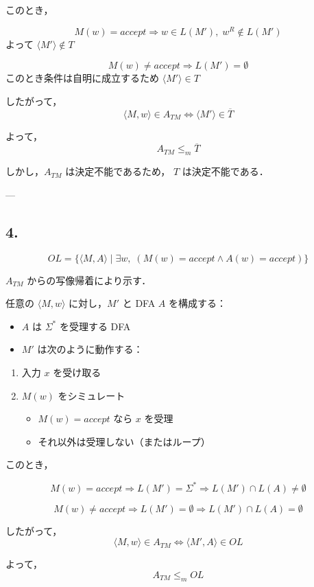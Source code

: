 \documentclass[a4paper,11pt]{ltjsarticle}
\begin{document}
このとき，

\[
M(w)=accept \Rightarrow w \in L(M'),\; w^R \notin L(M')
\]
よって $\langle M' \rangle \notin T$

\[
M(w)\neq accept \Rightarrow L(M')=\emptyset
\]
このとき条件は自明に成立するため $\langle M' \rangle \in T$

したがって，
\[
\langle M,w\rangle \in A_{TM} \iff \langle M' \rangle \in \overline{T}
\]

よって，
\[
A_{TM} \leq_m \overline{T}
\]

しかし，$A_{TM}$ は決定不能であるため，
$T$ は決定不能である．

---

\subsection*{4.}
\[
OL = \{ \langle M,A \rangle \mid \exists w,\; (M(w)=accept \land A(w)=accept) \}
\]

$A_{TM}$ からの写像帰着により示す．

任意の $\langle M,w\rangle$ に対し，$M'$ と DFA $A$ を構成する：

\begin{itemize}
    \item $A$ は $\Sigma^*$ を受理する DFA
    \item $M'$ は次のように動作する：
\end{itemize}

\begin{enumerate}
    \item 入力 $x$ を受け取る
    \item $M(w)$ をシミュレート
    \begin{itemize}
        \item $M(w)=accept$ なら $x$ を受理
        \item それ以外は受理しない（またはループ）
    \end{itemize}
\end{enumerate}

このとき，

\[
M(w)=accept \Rightarrow L(M')=\Sigma^*
\Rightarrow L(M') \cap L(A) \neq \emptyset
\]

\[
M(w)\neq accept \Rightarrow L(M')=\emptyset
\Rightarrow L(M') \cap L(A) = \emptyset
\]

したがって，
\[
\langle M,w\rangle \in A_{TM}
\iff
\langle M',A\rangle \in OL
\]

よって，
\[
A_{TM} \leq_m OL
\]
\end{document}
